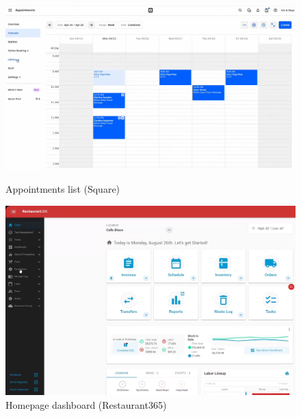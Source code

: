 \documentclass[]{VUMIFTemplateClass}
\begin{document}
\begin{figure}[h]
    \centering
    \begin{minipage}{0.48\textwidth}
        \centering
        \includegraphics[width=\textwidth]{images/examples/appointments_square.png}
        \caption{Appointments list (Square)}
    \end{minipage}
    \hfill
    \begin{minipage}{0.48\textwidth}
        \centering
        \includegraphics[width=\textwidth]{images/examples/homepage_r365.png}
        \caption{Homepage dashboard (Restaurant365)}
    \end{minipage}
\end{figure}
\end{document}

